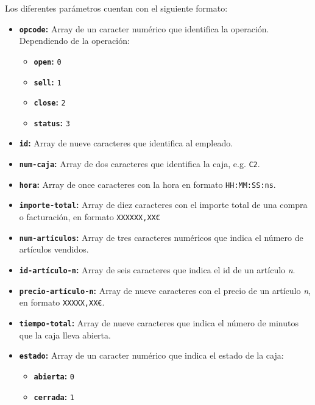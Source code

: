 Los diferentes parámetros cuentan con el siguiente formato:
\begin{itemize}
    \item \textbf{\texttt{opcode}:} Array de un caracter numérico que identifica la operación.\\
    Dependiendo de la operación:
    \begin{itemize}
        \item \textbf{\texttt{open}:} \texttt{0}
        \item \textbf{\texttt{sell}:} \texttt{1}
        \item \textbf{\texttt{close}:} \texttt{2}
        \item \textbf{\texttt{status}:} \texttt{3}
    \end{itemize}
    \item \textbf{\texttt{id}:} Array de nueve caracteres que identifica al empleado.
    \item \textbf{\texttt{num-caja}:} Array de dos caracteres que identifica la caja, e.g. \texttt{C2}.
    \item \textbf{\texttt{hora}:} Array de once caracteres con la hora en formato \texttt{HH:MM:SS:ns}.
    \item \textbf{\texttt{importe-total}:} Array de diez caracteres con el importe total de una compra o facturación, en formato \texttt{XXXXXX,XX€}
    \item \textbf{\texttt{num-artículos}:} Array de tres caracteres numéricos que indica el número de artículos vendidos.
    \item \textbf{\texttt{id-artículo-n}:} Array de seis caracteres que indica el id de un artículo \textit{n}.
    \item \textbf{\texttt{precio-artículo-n}:} Array de nueve caracteres con el precio de un artículo \textit{n}, en formato \texttt{XXXXX,XX€}.
    \item \textbf{\texttt{tiempo-total}:} Array de nueve caracteres que indica el número de minutos que la caja lleva abierta.
    \item \textbf{\texttt{estado}:} Array de un caracter numérico que indica el estado de la caja:
    \begin{itemize}
        \item \textbf{\texttt{abierta}:} \texttt{0}
        \item \textbf{\texttt{cerrada}:} \texttt{1}
    \end{itemize}
\end{itemize}


